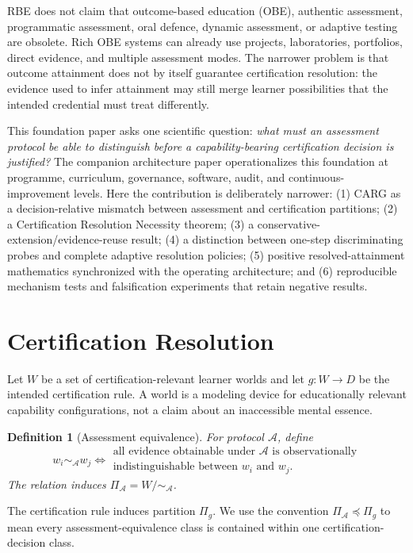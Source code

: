 \documentclass[11pt]{article}
\newtheorem{definition}{Definition}
\newcommand{\cA}{\mathcal{A}}\newcommand{\cE}{\mathcal{E}}\newcommand{\RBE}{\textsc{RBE}}
\begin{document}
RBE does not claim that outcome-based education (OBE), authentic assessment, programmatic assessment, oral defence, dynamic assessment, or adaptive testing are obsolete. Rich OBE systems can already use projects, laboratories, portfolios, direct evidence, and multiple assessment modes. The narrower problem is that outcome attainment does not by itself guarantee certification resolution: the evidence used to infer attainment may still merge learner possibilities that the intended credential must treat differently.

This foundation paper asks one scientific question: \emph{what must an assessment protocol be able to distinguish before a capability-bearing certification decision is justified?} The companion architecture paper operationalizes this foundation at programme, curriculum, governance, software, audit, and continuous-improvement levels. Here the contribution is deliberately narrower: (1) CARG as a decision-relative mismatch between assessment and certification partitions; (2) a Certification Resolution Necessity theorem; (3) a conservative-extension/evidence-reuse result; (4) a distinction between one-step discriminating probes and complete adaptive resolution policies; (5) positive resolved-attainment mathematics synchronized with the operating architecture; and (6) reproducible mechanism tests and falsification experiments that retain negative results.

\section{Certification Resolution}
Let $W$ be a set of certification-relevant learner worlds and let $g:W\to D$ be the intended certification rule. A world is a modeling device for educationally relevant capability configurations, not a claim about an inaccessible mental essence.

\begin{definition}[Assessment equivalence]
For protocol $\cA$, define
\[
w_i\sim_{\cA}w_j\Longleftrightarrow\begin{array}{c}\text{all evidence obtainable under $\cA$ is observationally}\\\text{indistinguishable between $w_i$ and $w_j$}.\end{array}
\]
The relation induces $\Pi_{\cA}=W/\!\sim_{\cA}$.
\end{definition}
The certification rule induces partition $\Pi_g$. We use the convention $\Pi_{\cA}\preceq\Pi_g$ to mean every assessment-equivalence class is contained within one certification-decision class.
\end{document}
